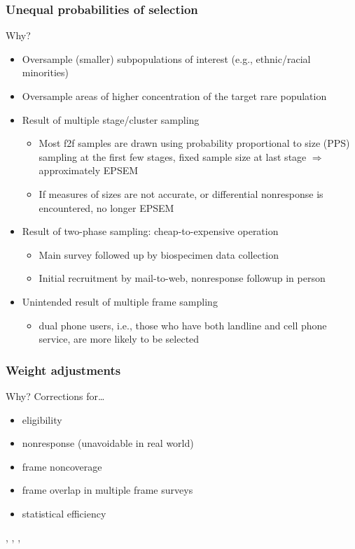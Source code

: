 \documentclass[handout]{beamer}
\begin{document}
\begin{frame}\frametitle{Unequal probabilities of selection}

Why?

\begin{itemize}
    \item Oversample (smaller) subpopulations of interest (e.g., ethnic/racial minorities)
    \item Oversample areas of higher concentration of the target rare population
    \item Result of multiple stage/cluster sampling
    \begin{itemize}
        \item Most f2f samples are drawn using probability proportional to size (PPS) 
            sampling at the first few stages,
            fixed sample size at last stage $\Rightarrow$ approximately EPSEM
        \item If measures of sizes are not accurate, or differential nonresponse is 
            encountered, no longer EPSEM
    \end{itemize}
    \item Result of two-phase sampling: cheap-to-expensive operation
    \begin{itemize}
        \item Main survey followed up by biospecimen data collection
        \item Initial recruitment by mail-to-web, nonresponse followup in person
    \end{itemize}
    \item Unintended result of multiple frame sampling
        \begin{itemize}
            \item dual phone users, i.e., those who have both landline and cell phone service, are more likely to be selected
        \end{itemize}
\end{itemize}

\end{frame}

\begin{frame}\frametitle{Weight adjustments}

Why? Corrections for\ldots

\begin{itemize}
    \item eligibility
    \item nonresponse (unavoidable in real world)
    \item frame noncoverage
    \item frame overlap in multiple frame surveys
    \item statistical efficiency
\end{itemize}

\citet{kalton:flores:cervantes:2003},
\citet{valliant:dever:kreuter:2013},
\citet{valliant:dever:2017},
\citet{kolenikov:2016}

\end{frame}
\end{document}
